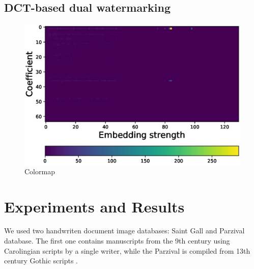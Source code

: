 \documentclass[runningheads]{llncs}
\begin{document}
\subsection{DCT-based dual watermarking}
\begin{figure} [H]
	\begin{center}
		\includegraphics[width=\textwidth]{colormapDCT.eps}
	\end{center}
	\caption{Colormap}
	\label{colormapDCT}
\end{figure}

\section{Experiments and Results}
We used two handwriten document image databases: Saint Gall \cite{fischer2011transcription} and Parzival \cite{fischer2009automatic} database. The first one contains manuscripts from the 9th century using Carolingian scripts by a single writer, while the Parzival is compiled from 13th century Gothic scripts \cite{pastor2016complete}.
\end{document}
